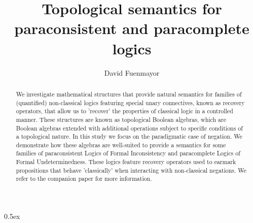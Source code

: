 \documentclass[11pt,a4paper]{article}
\begin{document}
\title{Topological semantics for paraconsistent and paracomplete logics}
\author{David Fuenmayor}

\maketitle

\begin{abstract}
We investigate mathematical structures that provide natural semantics for families of (quantified) non-classical logics featuring special unary connectives, known as recovery operators, that allow us to 'recover' the properties of classical logic in a controlled manner. These structures are known as topological Boolean algebras, which are Boolean algebras extended with additional operations subject to specific conditions of a topological nature. In this study we focus on the paradigmatic case of negation. We demonstrate how these algebras are well-suited to provide a semantics for some families of paraconsistent Logics of Formal Inconsistency and paracomplete Logics of Formal Undeterminedness. These logics feature recovery operators used to earmark propositions that behave 'classically' when interacting with non-classical negations.
We refer to the companion paper \cite{SemanticalInvestigations} for more information.
\end{abstract}

\tableofcontents

\vspace*{40pt}
\parindent 0pt\parskip 0.5ex





\end{document}
